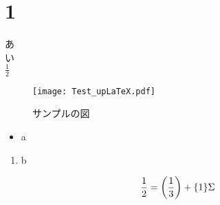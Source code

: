 \documentclass[a4paper,11pt,uplatex]{jsarticle}
\begin{document}
\tableofcontents
\clearpage


\title{}
\author{}
\date{\today}
\maketitle
\section{1}
あ\\
い\\
$\frac{1}{2}$

\begin{figure}[tb]
  \centering
  \texttt{[image: Test\_upLaTeX.pdf]}\\
  \caption{サンプルの図}
  \label{sample_image}
\end{figure}
\begin{itemize}
  \item a
\end{itemize}
\begin{enumerate}
  \item b
\end{enumerate}
\begin{align}
\frac{1}{2} = \qty(\frac{1}{3}) + \qty{1}\Sigma
\end{align}
\end{document}
